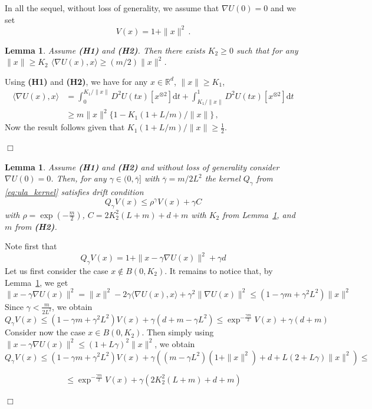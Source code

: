 \documentclass[bj]{imsart}
\newcommand{\ps}[2]{\langle #1, #2 \rangle}
\def\rset{\mathbb{R}}
\def\rmd{\mathrm{d}}
\def\rset{\mathbb{R}}
\newcommand{\proofendsign}{$\Box$}
\newtheorem{lem}[thm]{Lemma}
\newenvironment{proof}{{\noindent \bf Proof }}
 {{\hspace*{\fill}\proofendsign\par\bigskip}}
\def\eqsp{\,}
\begin{document}
In all the sequel, without loss of generality, we assume that $\nabla U(0)=0$ and we set
\begin{equation}
\label{eq:definition-V}
V(x) = 1 + \|x\|^2 \eqsp.
\end{equation}
\begin{lem}
  \label{lem:quadratic_behaviour}
  Assume {\bf (H1)} and {\bf (H2)}. Then there exists $K_2 \geq 0$ such that for any $ \| x \| \geq K_2$ $\ps{\nabla U(x)}{x} \geq (m/2) \| x \|^2$.
\end{lem}
\begin{proof}
  Using {\bf (H1)} and {\bf (H2)}, we have for any $x \in \rset^d$, $\| x \|\geq K_1$,
  \begin{align*}
    \ps{\nabla U(x)}{x}
    &= \int_{0}^{K_1/\| x \|} D^2 U(t x ) [x^{\otimes 2}] \rmd t + \int_{K_1/\| x \|} ^ 1 D^2 U(t x ) [x^{\otimes 2}] \rmd t\\
    & \geq m \|x \|^2 \{1- K_1 (1 +L/m)   / \| x \| \}\eqsp,
  \end{align*}
Now the result follows given that $K_1 (1 +L/m)   / \| x \| \geq \frac{1}{2}$.
\end{proof}
\begin{lem}
\label{lem:drift}
 Assume {\bf (H1)} and {\bf (H2)} and without loss of generality consider $\nabla U(0) = 0$.
 Then, for any $\gamma \in (0,\bar{\gamma}]$ with $\overline{\gamma} = m/2L^2$  the kernel $Q_\gamma$ from \eqref{eq:ula_kernel} satisfies drift condition
 \begin{equation}
\label{eq:lyapunov}
Q_{\gamma}V(x) \leq \rho^{\gamma} V(x) + \gamma C
\end{equation}
with   $\rho = \exp{\left(-\frac{m}{2}\right)}$, $C = 2K_2^2(L+m) + d + m$ with $K_2$ from Lemma~\ref{lem:quadratic_behaviour}, and $m$ from {\bf (H2)}.
\end{lem}

\begin{proof} 
Note first that
\[
Q_{\gamma}V(x) = 
1+ \| x - \gamma \nabla U(x) \|^2 + \gamma d
\]
Let us first consider the case $x \notin B(0,K_2)$.  
It remains to notice that, by Lemma~\ref{lem:quadratic_behaviour}, we get
\[
\|x - \gamma \nabla U(x) \|^2 = \|x\|^2 - 2\gamma \langle \nabla U(x), x\rangle + \gamma^2 \|\nabla U(x)\|^2 \leq \left(1 - \gamma m + \gamma^2 L^2\right)\|x\|^2
\]
Since $\gamma < \frac{m}{2L^2}$, we obtain
$$
Q_{\gamma}V(x) \leq (1-\gamma m + \gamma^2 L^2)V(x) + \gamma (d + m - \gamma L^2) \leq \exp^{-\frac{\gamma m}{2}}V(x) + \gamma (d + m)
$$
Consider now the case $x \in B(0,K_2)$. Then simply using $\|x-\gamma \nabla U(x)\|^2 \leq (1+L\gamma)^2\|x\|^2$, we obtain
$$
Q_{\gamma}V(x) \leq (1-\gamma m + \gamma^2 L^2)V(x) + \gamma\left((m - \gamma L^2)(1+\|x\|^2) + d + L(2+L\gamma)\|x\|^2\right) \leq
$$

$$
\leq \exp^{-\frac{\gamma m}{2}}V(x) + \gamma(2K_2^2(L+m) + d + m)
$$
\end{proof}
\end{document}
